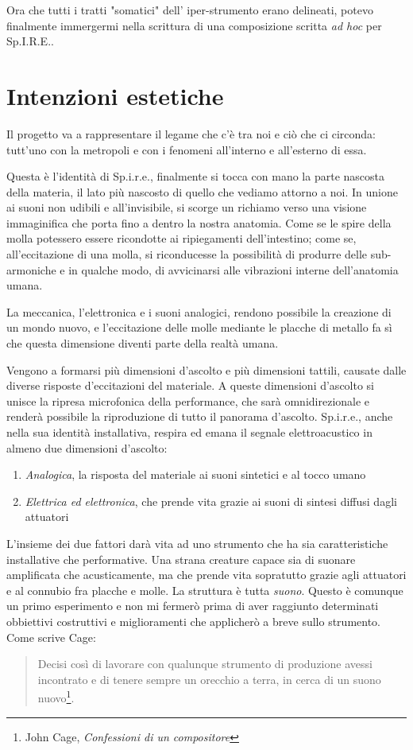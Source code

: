 Ora che tutti i tratti "somatici" dell' iper-strumento erano delineati, potevo finalmente immergermi nella scrittura di una composizione scritta \textit{ad hoc} per Sp.I.R.E..

\section{Intenzioni estetiche}
Il progetto va a rappresentare il legame che c'è tra noi e ciò che ci circonda: tutt'uno con la metropoli e con i fenomeni all'interno e all'esterno di essa.

Questa è l'identità di Sp.i.r.e., finalmente si tocca con mano la parte nascosta della materia, il lato più nascosto di quello che vediamo attorno a noi. In unione ai suoni non udibili e all'invisibile, si scorge un richiamo verso una visione immaginifica che porta fino a dentro la nostra anatomia. Come se le spire della molla potessero essere ricondotte ai ripiegamenti dell'intestino; come se, all'eccitazione di una molla, si riconducesse la possibilità di produrre delle sub-armoniche e in qualche modo, di avvicinarsi alle vibrazioni interne dell'anatomia umana.

La meccanica, l'elettronica e i suoni analogici, rendono possibile la creazione di un mondo nuovo, e l'eccitazione delle molle mediante le placche di metallo fa sì che questa dimensione diventi parte della realtà umana. 

Vengono a formarsi più dimensioni d'ascolto e più dimensioni tattili, causate dalle diverse risposte d'eccitazioni del materiale. A queste dimensioni d'ascolto si unisce la ripresa microfonica della performance, che sarà omnidirezionale e renderà possibile la riproduzione di tutto il panorama d'ascolto. Sp.i.r.e., anche nella sua identità installativa, respira ed emana il segnale elettroacustico in almeno due dimensioni d'ascolto:
\begin{enumerate}
\item{\textit{Analogica}, la risposta del materiale ai suoni sintetici e al tocco umano}
\item{\textit{Elettrica ed elettronica}, che prende vita grazie ai suoni di sintesi diffusi dagli attuatori}
\end{enumerate}

L'insieme dei due fattori darà vita ad uno strumento che ha sia caratteristiche installative che performative. Una strana creature capace sia di suonare amplificata che acusticamente, ma che prende vita sopratutto grazie agli attuatori e al connubio fra placche e molle. La struttura è tutta \textit{suono}. Questo è comunque un primo esperimento e non mi fermerò prima di aver raggiunto determinati obbiettivi costruttivi e miglioramenti che applicherò a breve sullo strumento. Come scrive Cage:
\begin{small}
\begin{quotation}
Decisi così di lavorare con qualunque strumento di produzione avessi incontrato e di tenere sempre un orecchio a terra, in cerca di un suono nuovo\footnote{John Cage, \textit{Confessioni di un compositore}}.
\end{quotation}
\end{small}

